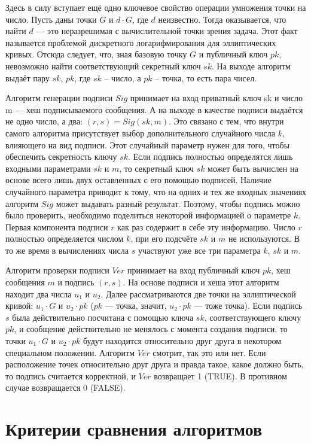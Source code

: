 Здесь в силу вступает ещё одно ключевое свойство операции умножения точки на число. Пусть даны точки $G$ и  $d \cdot G$, где $d$ неизвестно. Тогда оказывается, что найти $d$ — это неразрешимая с вычислительной точки зрения задача. Этот факт называется проблемой дискретного логарифмирования для эллиптических кривых. Отсюда следует, что, зная базовую точку $G$ и публичный ключ $pk$, невозможно найти соответствующий секретный ключ $sk$. На выходе алгоритм выдаёт пару $sk$, $pk$, где $sk$ -- число, а $pk$ -- точка, то есть пара чисел. 

Алгоритм генерации подписи $Sig$ принимает на вход приватный ключ sk и число m — хеш подписываемого сообщения. А на выходе в качестве подписи выдаётся не одно число, а два: $(r, s) = Sig(sk, m)$. Это связано с тем, что внутри самого алгоритма присутствует выбор дополнительного случайного числа $k$, влияющего на вид подписи. Этот случайный параметр нужен для того, чтобы обеспечить секретность ключу $sk$. Если подпись полностью определятся лишь входными параметрами $sk$ и $m$, то секретный ключ $sk$ может быть вычислен на основе всего лишь двух оставленных с его помощью подписей. Наличие случайного параметра приводит к тому, что на одних и тех же входных значениях алгоритм $Sig$ может выдавать разный результат. Поэтому, чтобы подпись можно было проверить, необходимо поделиться некоторой информацией о параметре $k$. Первая компонента подписи $r$ как раз содержит в себе эту информацию. Число $r$ полностью определяется числом $k$, при его подсчёте $sk$ и $m$ не используются. В то же время в вычислениях числа $s$ участвуют уже все три параметра $k$, $sk$ и $m$.

Алгоритм проверки подписи $Ver$ принимает на вход публичный ключ $pk$, хеш сообщения $m$ и подпись $(r, s)$. На основе подписи и хеша этот алгоритм находит два числа $u_1$ и $u_2$. Далее рассматриваются две точки на эллиптической кривой: $u_1 \cdot G$ и $u_2 \cdot pk$ ($pk$ — точка, значит, $u_2 \cdot pk$ — тоже точка). Если подпись $s$ была действительно посчитана с помощью ключа $sk$, соответствующего ключу $pk$, и сообщение действительно не менялось с момента создания подписи, то точки $u_1 \cdot G$ и $u_2 \cdot pk$ будут находится относительно друг друга в некотором специальном положении. Алгоритм $Ver$ смотрит, так это или нет. Если расположение точек относительно друг друга и правда такое, какое должно быть, то подпись считается корректной, и $Ver$ возвращает 1 (TRUE). В противном случае возвращается 0 (FALSE).~\cite{ECDSA}

\section{Критерии сравнения алгоритмов}

